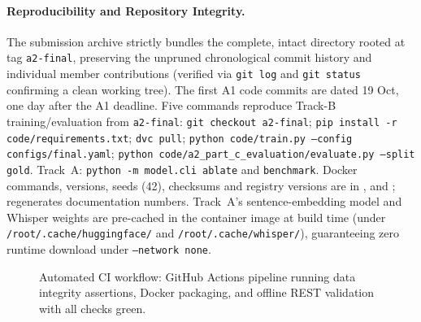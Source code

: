 \documentclass[sigconf,authordraft]{acmart}
\begin{document}
\paragraph{Reproducibility and Repository Integrity.}
The submission archive strictly bundles the complete, intact  directory rooted at tag \texttt{a2-final}, preserving the unpruned chronological commit history and individual member contributions (verified via \texttt{git log} and \texttt{git status} confirming a clean working tree). The first A1 code commits are dated 19 Oct, one day after the A1 deadline. Five commands reproduce Track-B training/evaluation from \texttt{a2-final}: \texttt{git checkout a2-final}; \texttt{pip install -r code/requirements.txt}; \texttt{dvc pull}; \texttt{python code/train.py --config configs/final.yaml}; \texttt{python code/a2\_part\_c\_evaluation/evaluate.py --split gold}. Track~A: \texttt{python -m model.cli ablate} and \texttt{benchmark}. Docker commands, versions, seeds (42), checksums and registry versions are in ,  and ;  regenerates documentation numbers. Track~A's sentence-embedding model and Whisper weights are pre-cached in the container image at build time (under \texttt{/root/.cache/huggingface/} and \texttt{/root/.cache/whisper/}), guaranteeing zero runtime download under \texttt{--network none}.
\begin{figure}[!htbp]
\centering{}
\caption{Automated CI workflow: GitHub Actions pipeline running data integrity assertions, Docker packaging, and offline REST validation with all checks green.}
\label{fig:ci}
\end{figure}
\FloatBarrier
\end{document}
